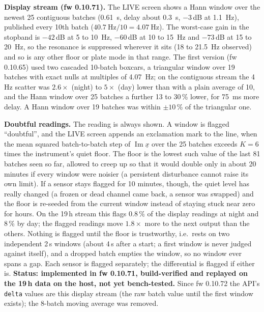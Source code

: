 \documentclass[11pt,a4paper]{article}
\begin{document}
\textbf{Display stream (fw 0.10.71).}  The LIVE screen shows a Hann window over
the newest 25 contiguous batches (\SI{0.61}{\second}, delay about
\SI{0.3}{\second}, $-3$\,dB at \SI{1.1}{\hertz}), published every 10th batch
($\SI{40.7}{\hertz}/10=\SI{4.07}{\hertz}$).  The worst-case gain in the stopband is
$-42$\,dB at 5 to \SI{10}{\hertz}, $-60$\,dB at 10 to \SI{15}{\hertz} and $-73$\,dB at
15 to \SI{20}{\hertz}, so the resonance is suppressed wherever it sits
(18 to \SI{21.5}{\hertz} observed) and so is any other floor or plate mode
in that range.  The first version (fw 0.10.65) used two cascaded 10-batch
boxcars, a triangular window over 19 batches with exact nulls at multiples of
\SI{4.07}{\hertz}; on the contiguous stream the 4\,Hz scatter was $2.6\times$
(night) to $5\times$ (day) lower than with a plain average of 10, and the Hann
window over 25 batches a further 13 to 30\,\% lower, for \SI{75}{\milli\second}
more delay.  A Hann window over 19 batches was within $\pm10$\,\% of the
triangular one.

\textbf{Doubtful readings.}  The reading is always shown.  A window is
flagged ``doubtful'', and the LIVE screen appends an exclamation mark to the
line, when the mean squared batch-to-batch step of $\operatorname{Im}\underline{x}$
over the 25 batches exceeds $K=6$ times the instrument's quiet floor.  The
floor is the lowest such value of the last 81 batches seen so far, allowed to
creep up so that it would double only in about 20 minutes if every window were
noisier (a persistent disturbance cannot raise its own limit).  If a sensor stays
flagged for 10 minutes, though, the quiet level has really changed (a frozen
or dead channel came back, a sensor was swapped) and the floor is re-seeded from
the current window instead of staying stuck near zero for hours.  On the 19\,h stream this flags
0.8\,\% of the display readings at night and 8\,\% by day; the flagged readings
move $1.8\times$ more to the next output than the others.  Nothing is flagged
until the floor is trustworthy, i.e.\ rests on two independent 2\,s windows
(about 4\,s after a start; a first window is never judged against itself), and a dropped
batch empties the window, so no window ever spans a gap.  Each sensor is
flagged separately; the differential is flagged if either is.
\textbf{Status: implemented in fw 0.10.71, build-verified and replayed on the 19\,h
data on the host, not yet bench-tested.}  Since fw 0.10.72 the API's
\texttt{delta} values are this display stream (the raw batch value until the
first window exists); the 8-batch moving average was removed.
\end{document}
